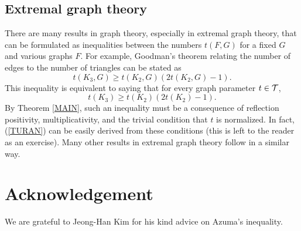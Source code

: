 \documentclass[fleqn]{article}
\begin{document}
\subsection{Extremal graph theory}

There are many results in graph theory, especially in extremal graph
theory, that can be formulated as inequalities between the numbers
$t(F,G)$ for a fixed $G$ and various graphs $F$. For example,
Goodman's theorem relating the number of edges to the number of
triangles can be stated as
\[
t(K_3,G)\ge t(K_2,G)(2t(K_2,G)-1).
\]
This inequality is equivalent to saying that for every graph
parameter $t\in{\cal T}$,
\begin{equation}\label{TURAN}
t(K_3)\ge t(K_2)(2t(K_2)-1).
\end{equation}
By Theorem \ref{MAIN}, such an inequality must be a consequence of
reflection positivity, multiplicativity, and the trivial condition
that $t$ is normalized. In fact, (\ref{TURAN}) can be easily derived
from these conditions (this is left to the reader as an exercise).
Many other results in extremal graph theory follow in a similar way.

\section*{Acknowledgement}

We are grateful to Jeong-Han Kim for his kind advice on Azuma's
inequality.
\end{document}
